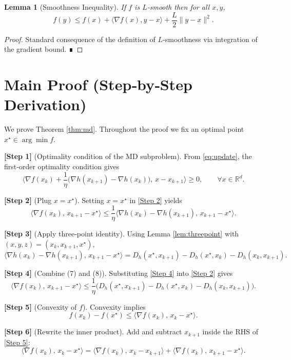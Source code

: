 \documentclass{article}
\newtheorem{lemma}{Lemma}
\newcommand{\grad}{\nabla}
\newcommand{\R}{\mathbb{R}}
\begin{document}
\begin{lemma}[Smoothness Inequality]\label{lem:smooth}
If $f$ is $L$‑smooth then for all $x,y$,
\[
f(y)\le f(x)+\langle\grad f(x),y-x\rangle+\frac{L}{2}\|y-x\|^{2}.
\tag{5}
\]
\end{lemma}
\begin{proof}
Standard consequence of the definition of $L$‑smoothness via integration of the gradient bound. ∎
\end{proof}

\section*{Main Proof (Step‑by‑Step Derivation)}
We prove Theorem \ref{thm:md}. Throughout the proof we fix an optimal point $x^{\star}\in\arg\min f$.

\noindent\textbf{[Step 1]} (Optimality condition of the MD subproblem).  
From \eqref{eq:update}, the first‑order optimality condition gives
\[
\big\langle \grad f(x_{k})+\frac{1}{\eta}\big(\nabla h(x_{k+1})-\nabla h(x_{k})\big),\,x-x_{k+1}\big\rangle\ge0,
\qquad\forall x\in\R^{d}.
\tag{6}
\]

\noindent\textbf{[Step 2]} (Plug $x=x^{\star}$).  
Setting $x=x^{\star}$ in \eqref{Step 2} yields
\[
\langle\grad f(x_{k}),\,x_{k+1}-x^{\star}\rangle
\le\frac{1}{\eta}\langle\nabla h(x_{k})-\nabla h(x_{k+1}),\,x_{k+1}-x^{\star}\rangle .
\tag{7}
\]

\noindent\textbf{[Step 3]} (Apply three‑point identity).  
Using Lemma \ref{lem:threepoint} with $(x,y,z)=(x_{k},x_{k+1},x^{\star})$,
\[
\langle\nabla h(x_{k})-\nabla h(x_{k+1}),\,x_{k+1}-x^{\star}\rangle
= D_{h}(x^{\star},x_{k+1})-D_{h}(x^{\star},x_{k})-D_{h}(x_{k},x_{k+1}).
\tag{8}
\]

\noindent\textbf{[Step 4]} (Combine (7) and (8)).  
Substituting \eqref{Step 4} into \eqref{Step 2} gives
\[
\langle\grad f(x_{k}),\,x_{k+1}-x^{\star}\rangle
\le\frac{1}{\eta}\Big( D_{h}(x^{\star},x_{k+1})-D_{h}(x^{\star},x_{k})-D_{h}(x_{k},x_{k+1})\Big).
\tag{9}
\]

\noindent\textbf{[Step 5]} (Convexity of $f$).  
Convexity implies
\[
f(x_{k})-f(x^{\star})\le\langle\grad f(x_{k}),\,x_{k}-x^{\star}\rangle.
\tag{10}
\]

\noindent\textbf{[Step 6]} (Rewrite the inner product).  
Add and subtract $x_{k+1}$ inside the RHS of \eqref{Step 5}:
\[
\langle\grad f(x_{k}),\,x_{k}-x^{\star}\rangle
= \langle\grad f(x_{k}),\,x_{k}-x_{k+1}\rangle
+ \langle\grad f(x_{k}),\,x_{k+1}-x^{\star}\rangle .
\tag{11}
\]
\end{document}
